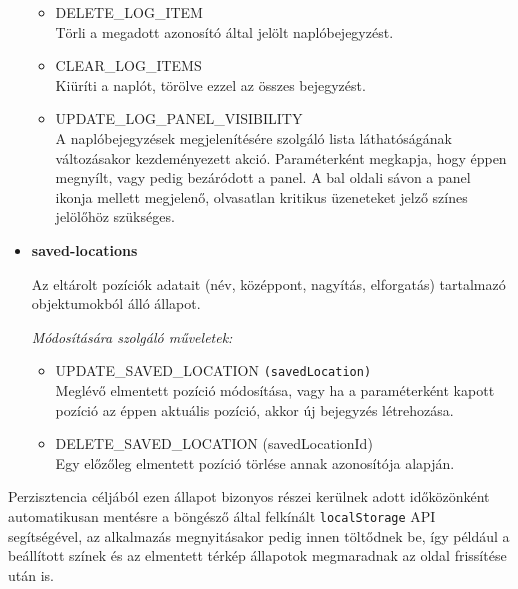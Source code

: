 \begin{itemize}
\begin{itemize}
      \item DELETE\_LOG\_ITEM \\
        Törli a megadott azonosító által jelölt naplóbejegyzést.

      \item CLEAR\_LOG\_ITEMS \\
        Kiüríti a naplót, törölve ezzel az összes bejegyzést.

      \item UPDATE\_LOG\_PANEL\_VISIBILITY \\
        A naplóbejegyzések megjelenítésére szolgáló lista láthatóságának
        változásakor kezdeményezett akció. Paraméterként megkapja, hogy éppen
        megnyílt, vagy pedig bezáródott a panel.
        A bal oldali sávon a panel ikonja mellett megjelenő, olvasatlan kritikus
        üzeneteket jelző színes jelölőhöz szükséges.

    \end{itemize}

  \item \textbf{saved-locations}

    Az eltárolt pozíciók adatait (név, középpont, nagyítás, elforgatás)
    tartalmazó objektumokból álló állapot.

    \textit{Módosítására szolgáló műveletek:}

    \begin{itemize}
      \item UPDATE\_SAVED\_LOCATION \verb|(savedLocation)| \\
        Meglévő elmentett pozíció módosítása, vagy ha a paraméterként kapott
        pozíció az éppen aktuális pozíció, akkor új bejegyzés létrehozása.

      \item DELETE\_SAVED\_LOCATION (savedLocationId) \\
        Egy előzőleg elmentett pozíció törlése annak azonosítója alapján.
    \end{itemize}

\end{itemize}

\noindent Perzisztencia céljából ezen állapot bizonyos részei kerülnek adott időközönként
automatikusan mentésre a böngésző által felkínált \verb|localStorage| API
segítségével, az alkalmazás megnyitásakor pedig innen töltődnek be, így például
a beállított színek és az elmentett térkép állapotok megmaradnak az oldal
frissítése után is.
